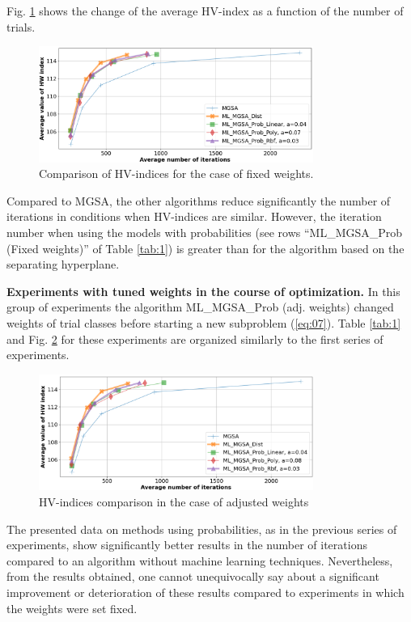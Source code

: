 \documentclass[runningheads]{llncs}
\begin{document}
Fig. \ref{fig:3} shows the change of the average HV-index as a function of the number of trials.
\begin{figure}
\centering
\includegraphics[width=0.8\textwidth]{fig3.png}
\caption{Comparison of HV-indices for the case of fixed weights.} 
\label{fig:3}
\end{figure}

Compared to MGSA, the other algorithms reduce significantly the number of iterations in conditions when HV-indices are similar. However, the iteration number when using the models with probabilities (see rows ``ML\_MGSA\_Prob (Fixed weights)'' of Table \ref{tab:1}) is greater than for the algorithm based on the separating hyperplane.

\textbf{Experiments with tuned weights in the course of optimization.} In this group of experiments the algorithm ML\_MGSA\_Prob (adj. weights) changed weights of trial classes before starting a new subproblem (\ref{eq:07}). Table \ref{tab:1} and Fig. \ref{fig:4} for these experiments are organized similarly to the first series of experiments.

\begin{figure}
\centering
\includegraphics[width=0.8\textwidth]{fig4.png}
\caption{HV-indices comparison  in the case of adjusted weights} 
\label{fig:4}
\end{figure}

The presented data on methods using probabilities, as in the previous series of experiments, show significantly better results in the number of iterations compared to an algorithm without machine learning techniques. Nevertheless, from the results obtained, one cannot unequivocally say about a significant improvement or deterioration of these results compared to experiments in which the weights were set fixed.
\end{document}
